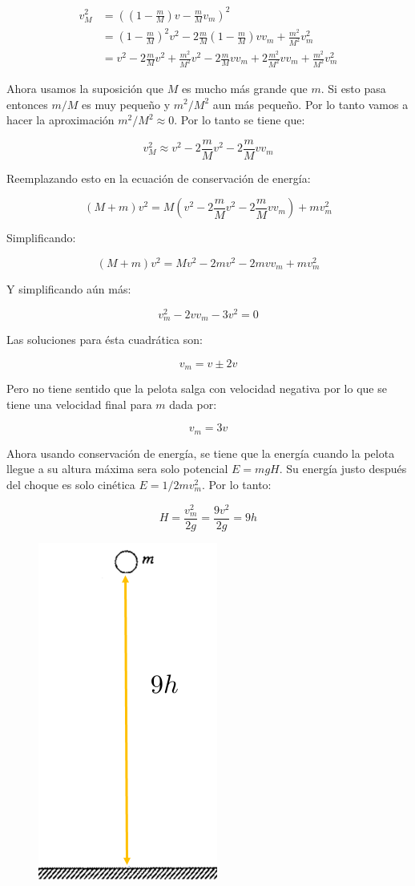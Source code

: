 \documentclass[a4paper,11pt]{article}
\theoremstyle{mytheor}
\begin{document}
\begin{align*}
v_M^2 & = \left( \left(1-\frac{m}{M}\right)v -  \frac{m}{M} v_m \right)^2 \\
& =    \left(1-\frac{m}{M}\right)^2v^2 -2\frac{m}{M} \left(1-\frac{m}{M}\right) v v_m + \frac{m^2}{M^2} v_m^2\\
& = v^2 - 2\frac{m}{M} v^2 + \frac{m^2}{M^2}v^2 - 2\frac{m}{M} v v_m + 2\frac{m^2}{M^2} v v_m  + \frac{m^2}{M^2} v_m^2
\end{align*}

Ahora usamos la suposición que $M$ es mucho más grande que $m$. Si esto pasa entonces $m/M$ es muy pequeño y $m^2/M^2$ aun más pequeño. Por lo tanto vamos a hacer la aproximación $m^2/M^2 \approx 0$. Por lo tanto se tiene que:


$$ v_M^2 \approx v^2 -  2\frac{m}{M} v^2 - 2\frac{m}{M} v v_m $$

Reemplazando esto en la ecuación de conservación de energía:

$$  (M+m) v^2 =  M  \left(v^2 -  2\frac{m}{M} v^2 - 2\frac{m}{M} v v_m\right) +  m v_m^2 $$

Simplificando:

$$  (M+m) v^2 =  M  v^2 -  2m v^2 - 2m v v_m +  m v_m^2 $$

Y simplificando aún más:

$$ v_m^2 - 2 v v_m  - 3v^2 = 0$$

Las soluciones para ésta cuadrática son:

$$ v_m = {v \pm 2 v} $$

Pero no tiene sentido que la pelota salga con velocidad negativa por lo que se tiene una velocidad final para $m$ dada por:

$$ v_m = 3v$$

Ahora usando conservación de energía, se tiene que la energía cuando la pelota llegue a su altura máxima sera solo potencial $E = mg H$. Su energía justo después del choque es solo cinética $E = 1/2 m v_m^2$. Por lo tanto:

$$ H = \frac{v^2_m}{2g} = \frac{9 v^2}{2g} = 9h$$

\begin{figure}[h]
	\includegraphics[width=.23\linewidth]{4}
	\label{fcN4}
\end{figure}
\end{document}
